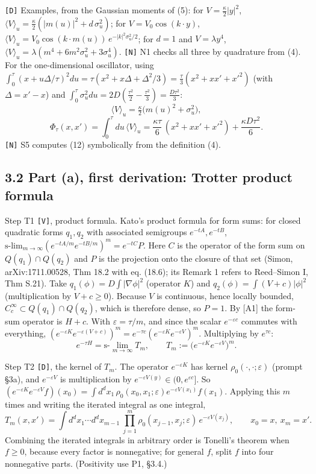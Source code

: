 \documentclass[11pt,a4paper]{article}
\begin{document}
\texttt{[D]} Examples, from the Gaussian moments of (5): for \(V=\tfrac\kappa2|y|^2\), \(\langle V\rangle_u=\tfrac\kappa2(|m(u)|^2+d\,\sigma_u^2)\); for \(V=V_0\cos(k\cdot y)\), \(\langle V\rangle_u=V_0\cos(k\cdot m(u))\,e^{-|k|^2\sigma_u^2/2}\); for \(d=1\) and \(V=\lambda y^4\), \(\langle V\rangle_u=\lambda(m^4+6m^2\sigma_u^2+3\sigma_u^4)\). \texttt{[N]} N1 checks all three by quadrature from (4). For the one-dimensional oscillator, using \(\int_0^\tau(x+u\Delta/\tau)^2du=\tau(x^2+x\Delta+\Delta^2/3)=\tfrac\tau3(x^2+xx'+x'^2)\) (with \(\Delta=x'-x\)) and \(\int_0^\tau\sigma_u^2du=2D(\tfrac{\tau^2}2-\tfrac{\tau^2}3)=\tfrac{D\tau^2}{3}\):
\[\langle V\rangle_u=\tfrac\kappa2\big(m(u)^2+\sigma_u^2\big),\tag{11}\]
\[\Phi_\tau(x,x')=\int_0^\tau du\,\langle V\rangle_u=\frac{\kappa\tau}{6}\,(x^2+xx'+x'^2)+\frac{\kappa D\tau^2}{6}.\tag{12}\]
\texttt{[N]} S5 computes (12) symbolically from the definition (4).

\hypertarget{part-a-first-derivation-trotter-product-formula}{%
\subsection{3.2 Part (a), first derivation: Trotter product formula}\label{part-a-first-derivation-trotter-product-formula}}

Step T1 \texttt{[V]}, product formula. Kato's product formula for form sums: for closed quadratic forms \(q_1,q_2\) with associated semigroups \(e^{-tA},e^{-tB}\), \(\text{s-lim}_{m\to\infty}(e^{-tA/m}e^{-tB/m})^m=e^{-tC}P\). Here \(C\) is the operator of the form sum on \(Q(q_1)\cap Q(q_2)\) and \(P\) is the projection onto the closure of that set (Simon, arXiv:1711.00528, Thm 18.2 with eq. (18.6); its Remark 1 refers to Reed--Simon I, Thm S.21). Take \(q_1(\phi)=D\int|\nabla\phi|^2\) (operator \(K\)) and \(q_2(\phi)=\int(V+c)|\phi|^2\) (multiplication by \(V+c\ge0\)). Because \(V\) is continuous, hence locally bounded, \(C_c^\infty\subset Q(q_1)\cap Q(q_2)\), which is therefore dense, so \(P=1\). By {[}A1{]} the form-sum operator is \(H+c\). With \(\varepsilon=\tau/m\), and since the scalar \(e^{-\varepsilon c}\) commutes with everything, \((e^{-\varepsilon K}e^{-\varepsilon(V+c)})^m=e^{-\tau c}(e^{-\varepsilon K}e^{-\varepsilon V})^m\). Multiplying by \(e^{\tau c}\):
\[e^{-\tau H}=\text{s-}\lim_{m\to\infty}T_m,\qquad T_m:=\big(e^{-\varepsilon K}e^{-\varepsilon V}\big)^m.\tag{13}\]

Step T2 \texttt{[D]}, the kernel of \(T_m\). The operator \(e^{-\varepsilon K}\) has kernel \(\rho_0(\cdot,\cdot;\varepsilon)\) (prompt §3a), and \(e^{-\varepsilon V}\) is multiplication by \(e^{-\varepsilon V(y)}\in(0,e^{\varepsilon c}]\). So \((e^{-\varepsilon K}e^{-\varepsilon V}f)(x_0)=\int d^dx_1\,\rho_0(x_0,x_1;\varepsilon)e^{-\varepsilon V(x_1)}f(x_1)\). Applying this \(m\) times and writing the iterated integral as one integral,
\[T_m(x,x')=\int d^dx_1\cdots d^dx_{m-1}\ \prod_{j=1}^m\rho_0(x_{j-1},x_j;\varepsilon)\,e^{-\varepsilon V(x_j)},\qquad x_0=x,\ x_m=x'.\tag{14}\]
Combining the iterated integrals in arbitrary order is Tonelli's theorem when \(f\ge0\), because every factor is nonnegative; for general \(f\), split \(f\) into four nonnegative parts. (Positivity use P1, §3.4.)
\end{document}
